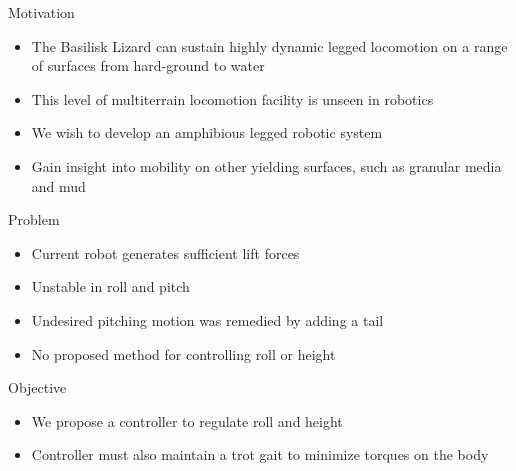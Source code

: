 \textcolor{prime}{\textsf{Motivation}}
\begin{itemize}
	\item The Basilisk Lizard can sustain highly dynamic legged locomotion on a range of surfaces from hard-ground to water \cite{glasheen1996hydrodynamic}
	\item This level of multiterrain locomotion facility is unseen in robotics
    \item We wish to develop an amphibious legged robotic system
    \item Gain insight into mobility on other yielding surfaces, such as granular media and mud
\end{itemize} 
\vspace{2EX}

\textcolor{prime}{\textsf{Problem}}
\begin{itemize}
    \item Current robot generates sufficient lift forces
    \item Unstable in roll and pitch
    \item Undesired pitching motion was remedied by adding a tail~\cite{park2010roll}
    \item No proposed method for controlling roll or height
\end{itemize}
\vspace{2EX}

\textcolor{prime}{\textsf{Objective}}
\begin{itemize}
	\item We propose a controller to regulate roll and height 
	\item Controller must also maintain a trot gait to minimize torques on the body
\end{itemize}
